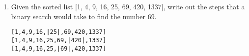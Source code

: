\documentclass[11pt]{article}
\newenvironment{answer}{\large\lstset{basicstyle=\tiny\ttfamily}\color{white}}{}
\newenvironment{answer}{\large\lstset{basicstyle=\large\ttfamily}\color{red}}{}
\begin{document}
\begin{enumerate}
\item Given the sorted list [1, 4, 9, 16, 25, 69, 420, 1337], write out the steps that a binary search would take to find the number 69.
\begin{answer}
\begin{lstlisting}
[1,4,9,16,|25|,69,420,1337]
[1,4,9,16,25,69,|420|,1337]
[1,4,9,16,25,|69|,420,1337]
\end{lstlisting}
\end{answer}

\end{enumerate}
\end{document}
